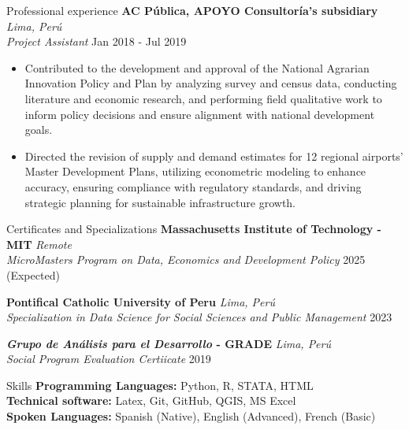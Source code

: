 \documentclass{resume} %
\begin{document}
\begin{rSection}{Professional experience}
\textbf{AC Pública, APOYO Consultoría's subsidiary} \hfill \textit{Lima, Perú}\\
\textit{Project Assistant} \hfill Jan 2018 - Jul 2019
 \begin{itemize}
    \itemsep -3pt {} 
     \item Contributed to the development and approval of the National Agrarian Innovation Policy and Plan by analyzing survey and census data, conducting literature and economic research, and performing field qualitative work to inform policy decisions and ensure alignment with national development goals.
     \item Directed the revision of supply and demand estimates for 12 regional airports’ Master Development Plans, utilizing econometric modeling to enhance accuracy, ensuring compliance with regulatory standards, and driving strategic planning for sustainable infrastructure growth.
 \end{itemize}
\end{rSection} 

\pagebreak
\begin{rSection}{Certificates and Specializations}
    {\bf Massachusetts  Institute  of  Technology  -  MIT} \hfill \textit{Remote} \\
    \textit{MicroMasters Program on Data, Economics and Development Policy} \hfill {2025 (Expected)}

    {\bf Pontifical Catholic University of Peru} \hfill \textit{Lima, Perú} \\
    \textit{Specialization in Data Science for Social Sciences and Public Management} \hfill {2023}


    {\bf \textit{Grupo de Análisis para el Desarrollo} - GRADE} \hfill \textit{Lima, Perú} \\
    \textit{Social Program Evaluation Certiicate} \hfill {2019}
\end{rSection}

\begin{rSection}{Skills} 
    \textbf{Programming Languages:} Python, R, STATA, HTML \\
    \textbf{Technical software:} Latex, Git, GitHub, QGIS, MS Excel \\
    \textbf{Spoken Languages:} Spanish (Native), English (Advanced), French (Basic)
\end{rSection}
\end{document}

